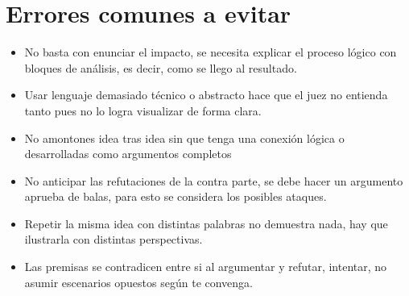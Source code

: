 \documentclass[11pt]{article}
\begin{document}
\section{Errores comunes a evitar}
\label{sec:orgaa49385}
\begin{itemize}
\item No basta con enunciar el impacto, se necesita explicar el proceso
lógico con bloques de análisis, es decir, como se llego al
resultado.

\item Usar lenguaje demasiado técnico o abstracto hace que el juez no
entienda tanto pues no lo logra visualizar de forma clara.

\item No amontones idea tras idea sin que tenga una conexión lógica o
desarrolladas como argumentos completos

\item No anticipar las refutaciones de la contra parte, se debe hacer un
argumento aprueba de balas, para esto se considera los posibles
ataques.

\item Repetir la misma idea con distintas palabras no demuestra nada, hay
que ilustrarla con distintas perspectivas.

\item Las premisas se contradicen entre si al argumentar y refutar,
intentar, no asumir escenarios opuestos según te convenga.
\end{itemize}
\end{document}
